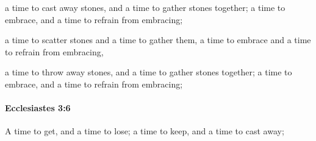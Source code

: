 			\begin{versebox}
					\item[BHS] 
					\item[LXX] 
					\item[ASV] a time to cast away stones, and a time to gather stones together; a time to embrace, and a time to refrain from embracing;
					\item[NIV] a time to scatter stones and a time to gather them, a time to embrace and a time to refrain from embracing,
					\item[NRSV] a time to throw away stones, and a time to gather stones together; a time to embrace, and a time to refrain from embracing;
			\end{versebox}

		\paragraph{Ecclesiastes 3:6} %
			\label{ECCLESIASTES-3-6}

			A time to get, and a time to lose; a time to keep, and a time to cast away;

